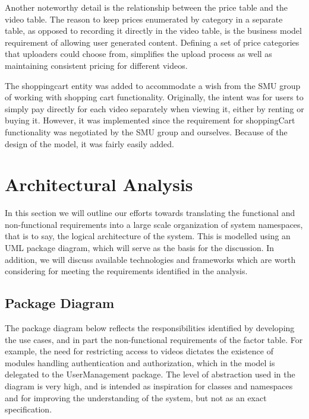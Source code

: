 Another noteworthy detail is the relationship between the price table and the video table. The reason to keep prices enumerated by category in a separate table, as opposed to recording it directly in the video table, is the business model requirement of allowing user generated content. Defining a set of price categories that uploaders could choose from, simplifies the upload process as well as maintaining consistent pricing for different videos.

The shoppingcart entity was added to accommodate a wish from the SMU group of working with shopping cart functionality. Originally, the intent was for users to simply pay directly for each video separately when viewing it, either by renting or buying it. However, it was implemented since the requirement for shoppingCart functionality was negotiated by the SMU group and ourselves. Because of the design of the model, it was fairly easily added.

\section{Architectural Analysis}
In this section we will outline our efforts towards translating the functional and non-functional requirements into a large scale organization of system namespaces, that is to say, the logical architecture of the system. This is modelled using an UML package diagram, which will serve as the basis for the discussion. In addition, we will discuss available technologies and frameworks which are worth considering for meeting the requirements identified in the analysis.

\subsection{Package Diagram}
The package diagram below reflects the responsibilities identified by developing the use cases, and in part the non-functional requirements of the factor table. For example, the need for restricting access to videos dictates the existence of modules handling authentication and authorization, which in the model is delegated to the UserManagement package. The level of abstraction used in the diagram is very high, and is intended as inspiration for classes and namespaces and for improving the understanding of the system, but not as an exact specification.

